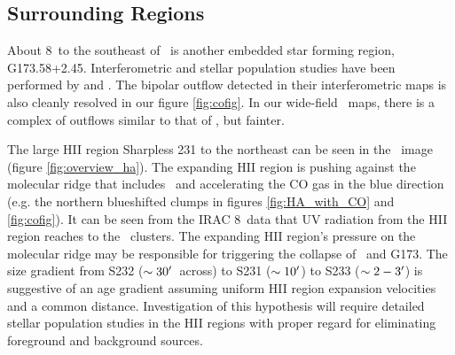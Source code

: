 
\subsection{Surrounding Regions}
\label{sec:surroundings}

About 8\arcmin\ to the southeast of \region\ is another embedded star forming
region, G173.58+2.45.  Interferometric and stellar population studies have been
performed by \citet{shepherd1996} and \citet{shepherd2002}.  The bipolar
outflow detected in their interferometric maps is also cleanly resolved in our
figure \ref{fig:cofig}.  In our wide-field \hh\ maps, there is a complex of
outflows similar to that of \region, but fainter.

The large HII region Sharpless 231 to the northeast can be seen in the \ha\ 
image (figure \ref{fig:overview_ha}).  The expanding HII region is pushing against
the molecular ridge that includes \region\ and accelerating the CO gas in the
blue direction (e.g. the northern blueshifted clumps in figures \ref{fig:HA_with_CO}
and \ref{fig:cofig}).  It can be seen from the IRAC 8\um\ data 
that UV radiation from the HII region reaches to
the \region\ clusters.  The expanding HII region's pressure on the molecular
ridge may be responsible for triggering the collapse of \region\ and G173.  The
size gradient from S232 ($\sim 30\mbox{$^\prime$}$\ across) to S231 ($\sim 10\mbox{$^\prime$}$)
to S233 ($\sim 2-3\mbox{$^\prime$}$) is suggestive of an age gradient assuming uniform
HII region expansion velocities and a common distance.  Investigation of this
hypothesis will require detailed stellar population studies in the HII regions
with proper regard for eliminating foreground and background sources.

